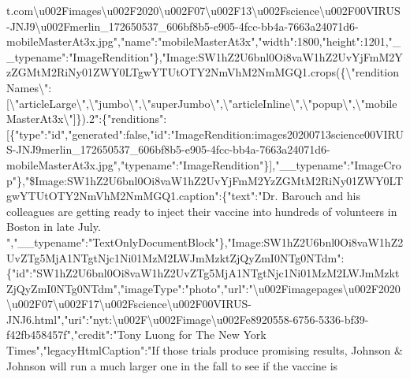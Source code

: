 t.com\textbackslash{}u002Fimages\textbackslash{}u002F2020\textbackslash{}u002F07\textbackslash{}u002F13\textbackslash{}u002Fscience\textbackslash{}u002F00VIRUS-JNJ9\textbackslash{}u002Fmerlin\_172650537\_606bf8b5-e905-4fcc-bb4a-7663a24071d6-mobileMasterAt3x.jpg","name":"mobileMasterAt3x","width":1800,"height":1201,"\_\_typename":"ImageRendition"\},"Image:SW1hZ2U6bnl0Oi8vaW1hZ2UvYjFmM2YzZGMtM2RiNy01ZWY0LTgwYTUtOTY2NmVhM2NmMGQ1.crops(\{\textbackslash{}"renditionNames\textbackslash{}":{[}\textbackslash{}"articleLarge\textbackslash{}",\textbackslash{}"jumbo\textbackslash{}",\textbackslash{}"superJumbo\textbackslash{}",\textbackslash{}"articleInline\textbackslash{}",\textbackslash{}"popup\textbackslash{}",\textbackslash{}"mobileMasterAt3x\textbackslash{}"{]}\}).2":\{"renditions":{[}\{"type":"id","generated":false,"id":"ImageRendition:images20200713science00VIRUS-JNJ9merlin\_172650537\_606bf8b5-e905-4fcc-bb4a-7663a24071d6-mobileMasterAt3x.jpg","typename":"ImageRendition"\}{]},"\_\_typename":"ImageCrop"\},"\$Image:SW1hZ2U6bnl0Oi8vaW1hZ2UvYjFmM2YzZGMtM2RiNy01ZWY0LTgwYTUtOTY2NmVhM2NmMGQ1.caption":\{"text":"Dr.
Barouch and his colleagues are getting ready to inject their vaccine
into hundreds of volunteers in Boston in late July.
","\_\_typename":"TextOnlyDocumentBlock"\},"Image:SW1hZ2U6bnl0Oi8vaW1hZ2UvZTg5MjA1NTgtNjc1Ni01MzM2LWJmMzktZjQyZmI0NTg0NTdm":\{"id":"SW1hZ2U6bnl0Oi8vaW1hZ2UvZTg5MjA1NTgtNjc1Ni01MzM2LWJmMzktZjQyZmI0NTg0NTdm","imageType":"photo","url":"\textbackslash{}u002Fimagepages\textbackslash{}u002F2020\textbackslash{}u002F07\textbackslash{}u002F17\textbackslash{}u002Fscience\textbackslash{}u002F00VIRUS-JNJ6.html","uri":"nyt:\textbackslash{}u002F\textbackslash{}u002Fimage\textbackslash{}u002Fe8920558-6756-5336-bf39-f42fb458457f","credit":"Tony
Luong for The New York Times","legacyHtmlCaption":"If those trials
produce promising results, Johnson \& Johnson will run a much larger one
in the fall to see if the vaccine is
